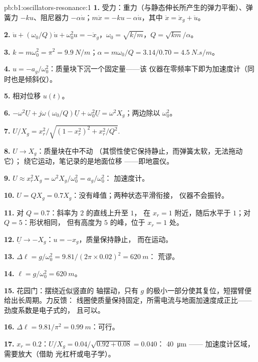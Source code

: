 \begin{solution}{pb:b1:oscillators-resonance:1}
\textbf{1.} 受力：重力（与静态伸长所产生的弹力平衡）、弹簧力
$-ku$、阻尼器力 $-\alpha\dot u$；$m\ddot x = -ku - \alpha\dot u$，其中 $\ddot x =
\ddot x_g + \ddot u$。

\textbf{2.} $\ddot u + (\omega_0/Q)\dot u + \omega_0^2u = -\ddot x_g$，$\omega_0 =
\sqrt{k/m}$，$Q = \sqrt{km}/\alpha$。

\textbf{3.} $k = m\omega_0^2 = \pi^2 = \qty{9.9}{N/m}$；$\alpha = m\omega_0/Q =
3.14/0.70 = \qty{4.5}{N.s/m}$。

\textbf{4.} $u = -a_g/\omega_0^2$：质量块下沉一个固定量——该
仪器在零频率下即为加速度计（同时也是倾斜仪）。

\textbf{5.} 相对位移 $u(t)$。

\textbf{6.} $-\omega^2\underline U + j\omega(\omega_0/Q)\underline U + \omega_0^2\underline U
= \omega^2X_g$；两边除以 $\omega_0^2$。

\textbf{7.} $U/X_g = x_r^2/\sqrt{(1 - x_r^2)^2 + x_r^2/Q^2}$.

\textbf{8.} $U \to X_g$：质量块在中不动
（其惯性使它保持静止，而弹簧太软，无法拖动它）；
绕它运动，笔记录的是地面位移
——即地震仪。

\textbf{9.} $U \approx x_r^2X_g = \omega^2X_g/\omega_0^2 = a_g/\omega_0^2$：
加速度计。

\textbf{10.} $U = QX_g = 0.7X_g$：没有峰值；两种状态平滑衔接，
仪器不会振铃。

\textbf{11.} 对 $Q = 0.7$：斜率为 $2$ 的直线上升至 $1$，
在 $x_r = 1$ 附近，随后水平于 $1$；对 $Q = 5$：形状相同，
但有高度为 $5$ 的峰，位于 $x_r = 1$ 处。

\textbf{12.} $\underline U \to -X_g$：$u = -x_g$，质量保持静止，
而在运动。

\textbf{13.} $\Delta\ell = g/\omega_0^2 = 9.81/(2\pi \times 0.02)^2 = \qty{620}{m}$：
荒谬。

\textbf{14.} $\ell = g/\omega_0^2 = \qty{620}{m}$。

\textbf{15.} 花园门：摆绕近似竖直的
轴摆动，只有 $g$ 的极小一部分使其复位，短摆臂便给出长周期。力反馈：
线圈使质量保持固定，所需电流与地面加速度成正比——
劲度系数是电子式的，
且可以。

\textbf{16.} $\Delta\ell = 9.81/\pi^2 = \qty{0.99}{m}$：可行。

\textbf{17.} $x_r = 0.2$：$U/X_g = 0.04/\sqrt{0.92 + 0.08} = 0.040$：
\qty{40}{\micro m} —— 加速度计区域，需要放大（借助
光杠杆或电子学）。


\end{solution}
